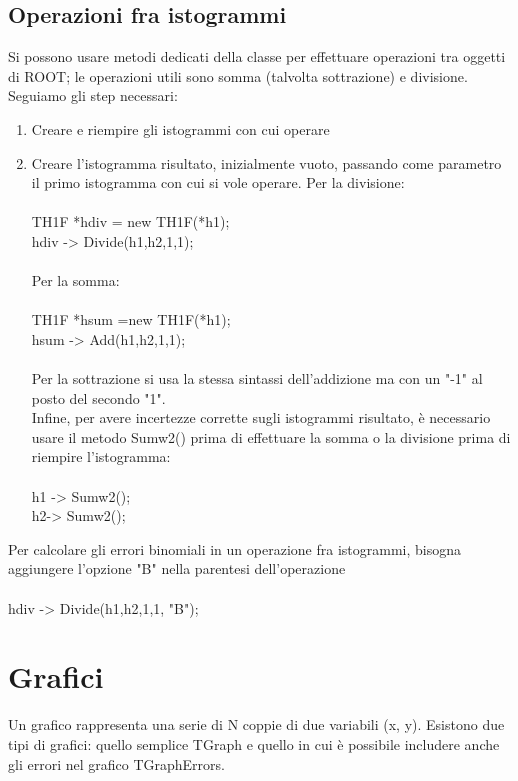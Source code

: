 \documentclass[10pt,a4paper]{article}
\begin{document}
\subsection{Operazioni fra istogrammi}
Si possono usare metodi dedicati della classe per effettuare operazioni tra oggetti di ROOT; le operazioni utili sono somma (talvolta sottrazione) e divisione. Seguiamo gli step necessari:
\begin{enumerate}
	\item Creare e riempire gli istogrammi con cui operare
	\item Creare l'istogramma risultato, inizialmente vuoto, passando come parametro il primo istogramma con cui si vole operare. Per la divisione:\\\\
	TH1F *hdiv = new TH1F(*h1);\\
	hdiv -> Divide(h1,h2,1,1);\\\\
	Per la somma:\\\\
	TH1F *hsum =new TH1F(*h1);\\
	hsum -> Add(h1,h2,1,1);\\\\
	Per la sottrazione si usa la stessa sintassi dell'addizione ma con un "-1" al posto del secondo "1".\\
	Infine, per avere incertezze corrette sugli istogrammi risultato, è necessario usare il metodo Sumw2() prima di effettuare la somma o la divisione prima di riempire l'istogramma:\\\\
	h1 -> Sumw2();\\
	h2-> Sumw2();\\
\end{enumerate}
Per calcolare gli errori binomiali in un operazione fra istogrammi, bisogna aggiungere l'opzione "B" nella parentesi dell'operazione\\\\
hdiv -> Divide(h1,h2,1,1, "B");
\section{Grafici}
Un grafico rappresenta una serie di N coppie di due variabili (x, y). Esistono due tipi di grafici: quello semplice TGraph e quello in cui è possibile includere anche gli errori nel grafico TGraphErrors. 
\end{document}
